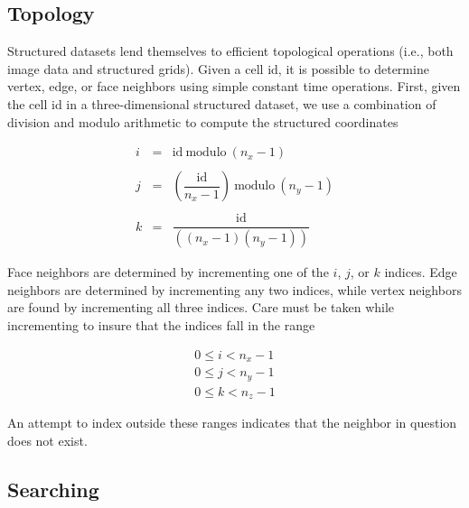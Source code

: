\subsection{Topology}

Structured datasets lend themselves to efficient topological operations (i.e., both image data and structured grids). Given a cell id, it is possible to determine vertex, edge, or face neighbors using simple constant time operations. First, given the cell id in a three-dimensional structured dataset, we use a combination of division and modulo arithmetic to compute the structured coordinates

\begin{equation}\label{eq:8.29}
\begin{array}{lll}
i &=& \text{id}\ \text{modulo}\ (n_x - 1) \\ \\
j &=& \left( \dfrac{\text{id}}{n_x - 1} \right)\ \text{modulo}\ (n_y - 1) \\ \\
k &=& \dfrac{\text{id}}{\left((n_x - 1)(n_y - 1)\right)}
\end{array}
\end{equation}

Face neighbors are determined by incrementing one of the $i$, $j$, or $k$ indices. Edge neighbors are determined by incrementing any two indices, while vertex neighbors are found by incrementing all three indices. Care must be taken while incrementing to insure that the indices fall in the range

\begin{equation}\label{eq:8.30}
\begin{array}{l}
0 \leq i < n_x - 1 \\
0 \leq j < n_y - 1 \\
0 \leq k < n_z - 1
\end{array}
\end{equation}

An attempt to index outside these ranges indicates that the neighbor in question does not exist.

\subsection{Searching}
\label{subsec:searching}


